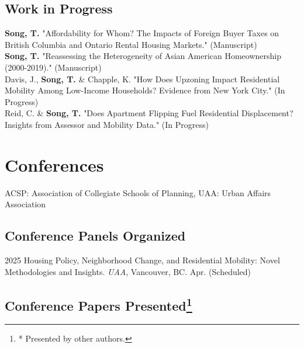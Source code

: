 \documentclass[12pt,letterpaper]{report}
\begin{document}
    \subsection*{Work in Progress}
    \begin{tablist}
        \textbf{Song, T.} "Affordability for Whom? The Impacts of Foreign Buyer Taxes on British Columbia and Ontario Rental Housing Markets." (Manuscript)\\
        \textbf{Song, T.} "Reassessing the Heterogeneity of Asian American Homeownership (2000-2019)." (Manuscript)\\
        Davis, J., \textbf{Song, T.} \& Chapple, K. "How Does Upzoning Impact Residential Mobility Among Low-Income Households? Evidence from New York City." (In Progress)\\
        Reid, C. \& \textbf{Song, T.} "Does Apartment Flipping Fuel Residential Displacement? Insights from Assessor and Mobility Data." (In Progress)
    \end{tablist}

\section*{Conferences}
ACSP: Association of Collegiate Schools of Planning, UAA: Urban Affairs Association

\subsection*{Conference Panels Organized}

\begin{tablist}
  \item[2025] \tab{}Housing Policy, Neighborhood Change, and Residential Mobility: Novel Methodologies and Insights. \emph{UAA}, Vancouver, BC. Apr. (Scheduled)
\end{tablist}

\subsection*{Conference Papers Presented\footnote{ * Presented by other authors.}}
\end{document}
